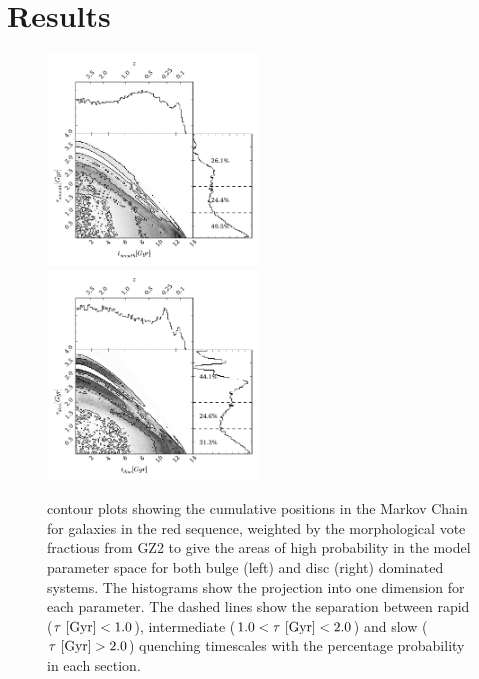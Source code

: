 \documentclass[useAMS,usenatbib]{mn2e}
\def\changed    {\color{titlecol} }
\begin{document}


\section{Results}\label{results}

\begin{figure}
\includegraphics[width=0.4975\textwidth]{red_smooth.pdf}
\includegraphics[width=0.4975\textwidth]{red_disc.pdf}
\caption[8pt]{{\changed contour plots showing the cumulative positions in the Markov Chain for galaxies in the red sequence, weighted by the morphological vote fractious from GZ2 to give the areas of high probability in the model parameter space for both bulge (left) and disc (right) dominated systems. The histograms show the projection into one dimension for each parameter. The dashed lines show the separation between rapid ($\tau ~\rm{[Gyr]} < 1.0$), intermediate ($1.0 < \tau ~\rm{[Gyr]} < 2.0$) and slow ($\tau ~\rm{[Gyr]} > 2.0$) quenching timescales with the percentage probability in each section.}}
\label{red_s}
\end{figure}
\end{document}

